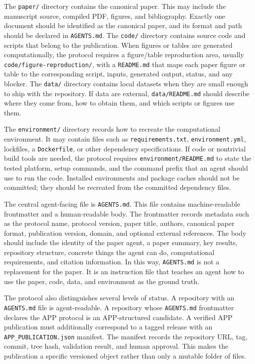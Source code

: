 \documentclass{article}
\begin{document}
The \texttt{paper/} directory contains the canonical paper. This may include
the manuscript source, compiled PDF, figures, and bibliography. Exactly one
document should be identified as the canonical paper, and its format and path
should be declared in \texttt{AGENTS.md}. The \texttt{code/} directory contains
source code and scripts that belong to the publication. When figures or tables
are generated computationally, the protocol requires a figure/table
reproduction area, usually \texttt{code/figure-reproduction/}, with a
\texttt{README.md} that maps each paper figure or table to the corresponding
script, inputs, generated output, status, and any blocker. The \texttt{data/}
directory contains local datasets when they are small enough to ship with the
repository. If data are external, \texttt{data/README.md} should describe where
they come from, how to obtain them, and which scripts or figures use them.

The \texttt{environment/} directory records how to recreate the computational
environment. It may contain files such as \texttt{requirements.txt},
\texttt{environment.yml}, lockfiles, a \texttt{Dockerfile}, or other dependency
specifications. If code or nontrivial build tools are needed, the protocol
requires \texttt{environment/README.md} to state the tested platform, setup
commands, and the command prefix that an agent should use to run the code.
Installed environments and package caches should not be committed; they should
be recreated from the committed dependency files.

The central agent-facing file is \texttt{AGENTS.md}. This file contains
machine-readable frontmatter and a human-readable body. The frontmatter records
metadata such as the protocol name, protocol version, paper title, authors,
canonical paper format, publication version, domain, and optional external
references. The body should include the identity of the paper agent, a paper
summary, key results, repository structure, concrete things the agent can do,
computational requirements, and citation information. In this way,
\texttt{AGENTS.md} is not a replacement for the paper. It is an instruction
file that teaches an agent how to use the paper, code, data, and environment as
the ground truth.

The protocol also distinguishes several levels of status. A repository with an
\texttt{AGENTS.md} file is agent-readable. A repository whose
\texttt{AGENTS.md} frontmatter declares the APP protocol is an APP-structured
candidate. A verified APP publication must additionally correspond to a tagged
release with an \texttt{APP\_PUBLICATION.json} manifest.
The manifest records the repository URL, tag, commit, tree hash, validation
result, and human approval. This makes the publication a specific versioned
object rather than only a mutable folder of files.
\end{document}
